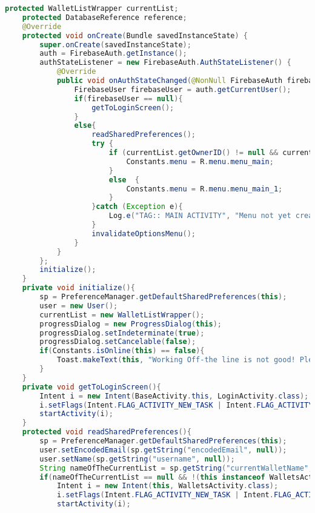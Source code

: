 \documentclass{article}
\begin{document}
\begin{lstlisting}[language=Java]
    protected WalletListWrapper currentList;
    protected DatabaseReference reference;
    @Override
    protected void onCreate(Bundle savedInstanceState) {
        super.onCreate(savedInstanceState);
        auth = FirebaseAuth.getInstance();
        authStateListener = new FirebaseAuth.AuthStateListener() {
            @Override
            public void onAuthStateChanged(@NonNull FirebaseAuth firebaseAuth) {
                FirebaseUser firebaseUser = auth.getCurrentUser();
                if(firebaseUser == null){
                    getToLoginScreen();
                }
                else{
                    readSharedPreferences();
                    try {
                        if (currentList.getOwnerID() != null && currentList.getOwnerID().equals(user.getEncodedEmail()) && BaseActivity.this instanceof MainActivity) {
                            Constants.menu = R.menu.menu_main;
                        }
                        else  {
                            Constants.menu = R.menu.menu_main_1;
                        }
                    }catch (Exception e){
                        Log.e("TAG:: MAIN ACTIVITY", "Menu not yet created");
                    }
                    invalidateOptionsMenu();
                }
            }
        };
        initialize();
    }
    private void initialize(){
        sp = PreferenceManager.getDefaultSharedPreferences(this);
        user = new User();
        currentList = new WalletListWrapper();
        progressDialog = new ProgressDialog(this);
        progressDialog.setIndeterminate(true);
        progressDialog.setCancelable(false);
        if(Constants.isOnline(this) == false){
            Toast.makeText(this, "Working Off-the line is not good! Please be online!", Toast.LENGTH_SHORT).show();
        }
    }
    private void getToLoginScreen(){
        Intent i = new Intent(BaseActivity.this, LoginActivity.class);
        i.setFlags(Intent.FLAG_ACTIVITY_NEW_TASK | Intent.FLAG_ACTIVITY_CLEAR_TASK);
        startActivity(i);
    }
    protected void readSharedPreferences(){
        sp = PreferenceManager.getDefaultSharedPreferences(this);
        user.setEncodedEmail(sp.getString("encodedEmail", null));
        user.setName(sp.getString("username", null));
        String nameOfTheCurrentList = sp.getString("currentWalletName", null);
        if(nameOfTheCurrentList == null && !(this instanceof WalletsActivity)){
            Intent i = new Intent(this, WalletsActivity.class);
            i.setFlags(Intent.FLAG_ACTIVITY_NEW_TASK | Intent.FLAG_ACTIVITY_CLEAR_TASK);
            startActivity(i);

\end{lstlisting}
\end{document}
